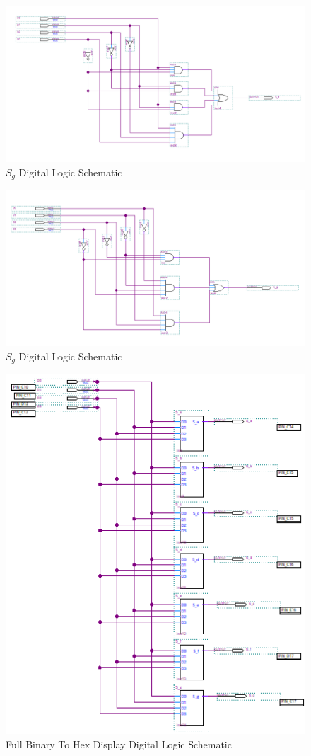 \documentclass{article}
\begin{document}
\begin{figure}[H]
  \centering
  \includegraphics[width=1\textwidth]{S_f_schem.png}
  \caption{$S_g$ Digital Logic Schematic}
\end{figure}

\begin{figure}[H]
  \centering
  \includegraphics[width=1\textwidth]{S_g_schem.png}
  \caption{$S_g$ Digital Logic Schematic}
\end{figure}

\begin{figure}[H]
  \centering
  \includegraphics[width=.55\textwidth]{full_schem.png}
  \caption{Full Binary To Hex Display Digital Logic Schematic}
\end{figure}
\end{document}
